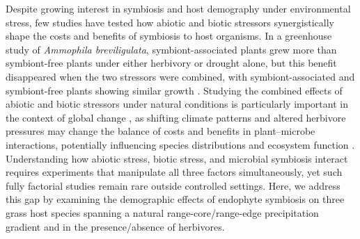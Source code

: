 \documentclass[12pt]{article}\usepackage[]{graphicx}\usepackage[dvipsnames]{xcolor}
\begin{document}
Despite growing interest in symbiosis and host demography under environmental stress, few studies have tested how abiotic and biotic stressors synergistically shape the costs and benefits of symbiosis to host organisms.
In a greenhouse study of \emph{Ammophila breviligulata}, symbiont-associated plants grew more than symbiont-free plants under either herbivory or drought alone, but this benefit disappeared when the two stressors were combined, with symbiont-associated and symbiont-free plants showing similar growth \citep{emery2010variation}.
Studying the combined effects of abiotic and biotic stressors under natural conditions is particularly important in the context of global change \citep{louthan2015and}, as shifting climate patterns and altered herbivore pressures may change the balance of costs and benefits in plant–microbe interactions, potentially influencing species distributions and ecosystem function \citep{reynolds2003grassroots}.
Understanding how abiotic stress, biotic stress, and microbial symbiosis interact requires experiments that manipulate all three factors simultaneously, yet such fully factorial studies remain rare outside controlled settings.
Here, we address this gap by examining the demographic effects of endophyte symbiosis on three grass host species spanning a natural range-core/range-edge precipitation gradient and in the presence/absence of herbivores.
\end{document}
